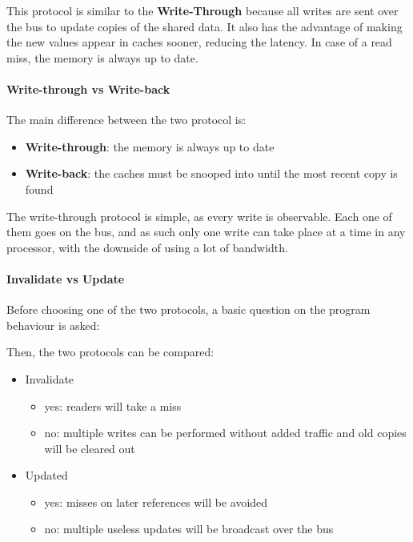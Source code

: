 \documentclass[english]{article}
\begin{document}
This protocol is similar to the \textbf{Write-Through} because all writes are sent over the bus to update copies of the shared data.
It also has the advantage of making the new values appear in caches sooner, reducing the latency.
In case of a read miss, the memory is always up to date.

\paragraph{Write-through vs Write-back}

The main difference between the two protocol is:

\begin{itemize}
  \item \textbf{Write-through}: the memory is always up to date
  \item \textbf{Write-back}: the caches must be snooped into until the most recent copy is found
\end{itemize}

The write-through protocol is simple, as every write is observable.
Each one of them goes on the bus, and as such only one write can take place at a time in any processor, with the downside of using a lot of bandwidth.

\paragraph{Invalidate vs Update}

Before choosing one of the two protocols, a basic question on the program behaviour is asked:


Then, the two protocols can be compared:

\begin{itemize}
  \item Invalidate
        \begin{itemize}
          \item yes: readers will take a miss
          \item no: multiple writes can be performed without added traffic and old copies will be cleared out
        \end{itemize}
  \item Updated
        \begin{itemize}
          \item yes: misses on later references will be avoided
          \item no: multiple useless updates will be broadcast over the bus
        \end{itemize}
\end{itemize}
\end{document}
